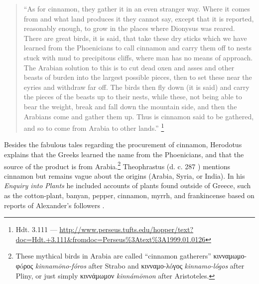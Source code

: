 \begin{quote}
    ``As for cinnamon, they gather it in an even stranger way. Where it comes from and what land produces it they cannot say, except that it is reported, reasonably enough, to grow in the places where Dionysus was reared. There are great birds, it is said, that take these dry sticks which we have learned from the Phoenicians to call cinnamon and carry them off to nests stuck with mud to precipitous cliffs, where man has no means of approach. The Arabian solution to this is to cut dead oxen and asses and other beasts of burden into the largest possible pieces, then to set these near the eyries and withdraw far off. The birds then fly down (it is said) and carry the pieces of the beasts up to their nests, while these, not being able to bear the weight, break and fall down the mountain side, and then the Arabians come and gather them up. Thus is cinnamon said to be gathered, and so to come from Arabia to other lands.'' \parencite[139]{herodotus_herodotus_1921}\footnote{Hdt. 3.111 --- \url{http://www.perseus.tufts.edu/hopper/text?doc=Hdt.+3.111&fromdoc=Perseus\%3Atext\%3A1999.01.0126}}
\end{quote}

Besides the fabulous tales regarding the procurement of cinnamon, Herodotus explains that the Greeks learned the name from the Phoenicians, and that the source of the product is from Arabia.\footnote{These mythical birds in Arabia are  called ``cinnamon gatherers'' κινναμωμο-φóρος \textit{kinnamōno-fóros} after Strabo and κινναμο-λóγος \textit{kinnamo-lógos} after Pliny, or just simply κιννάμωμον \textit{kinnámōmon} after Aristoteles.} Theophrastus (d. c. 287 \BC{}) mentions cinnamon but remains vague about the origins (Arabia, Syria, or India). In his \textit{Enquiry into Plants} he included accounts of plants found outside of Greece, such as the cotton-plant, banyan, pepper, cinnamon, myrrh, and frankincense based on reports of Alexander’s followers \parencite[xix,323]{theophrastus_enquiry_1916}.





